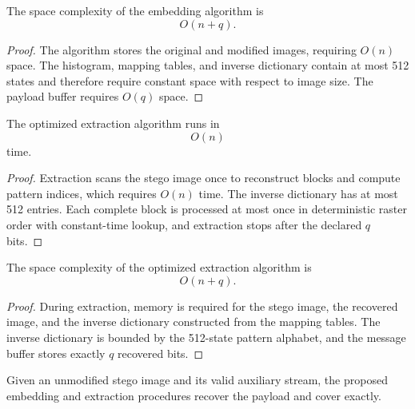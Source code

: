 \begin{proposition}
The space complexity of the embedding algorithm is
\begin{equation}
O(n+q).
\label{eq:embedding-space}
\end{equation}
\end{proposition}

\begin{proof}
The algorithm stores the original and modified images, requiring $O(n)$ space.
The histogram, mapping tables, and inverse dictionary contain at most 512
states and therefore require constant space with respect to image size. The
payload buffer requires $O(q)$ space.
\end{proof}

\begin{proposition}
The optimized extraction algorithm runs in
\begin{equation}
O(n)
\label{eq:extraction-time}
\end{equation}
time.
\end{proposition}

\begin{proof}
Extraction scans the stego image once to reconstruct blocks and compute pattern
indices, which requires $O(n)$ time.
The inverse dictionary has at most 512 entries. Each complete block is
processed at most once in deterministic raster order with constant-time
lookup, and extraction stops after the declared $q$ bits.
\end{proof}

\begin{proposition}
The space complexity of the optimized extraction algorithm is
\begin{equation}
O(n+q).
\label{eq:extraction-space}
\end{equation}
\end{proposition}

\begin{proof}
During extraction, memory is required for the stego image, the recovered image,
and the inverse dictionary constructed from the mapping tables.
The inverse dictionary is bounded by the 512-state pattern alphabet, and the
message buffer stores exactly $q$ recovered bits.
\end{proof}

\begin{proposition}
Given an unmodified stego image and its valid auxiliary stream, the proposed
embedding and extraction procedures recover the payload and cover exactly.
\end{proposition}

